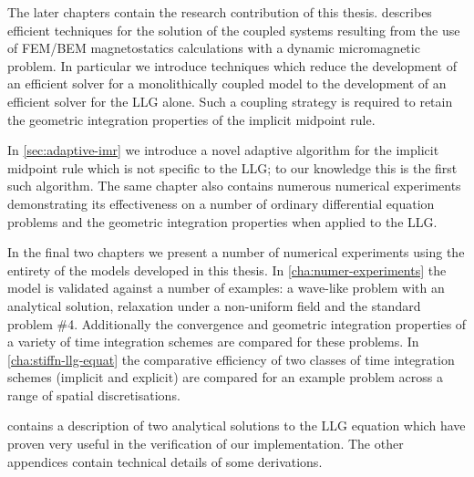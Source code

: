The later chapters contain the research contribution of this thesis.
 describes efficient techniques for the solution of the coupled systems resulting from the use of FEM/BEM magnetostatics calculations with a dynamic micromagnetic problem.
In particular we introduce techniques which reduce the development of an efficient solver for a monolithically coupled model to the development of an efficient solver for the LLG alone.
Such a coupling strategy is required to retain the geometric integration properties of the implicit midpoint rule.

In \cref{sec:adaptive-imr} we introduce a novel adaptive algorithm for the implicit midpoint rule which is not specific to the LLG; to our knowledge this is the first such algorithm.
The same chapter also contains numerous numerical experiments demonstrating its effectiveness on a number of ordinary differential equation problems and the geometric integration properties when applied to the LLG.

In the final two chapters we present a number of numerical experiments using the entirety of the models developed in this thesis.
In \cref{cha:numer-experiments} the model is validated against a number of examples: a wave-like problem with an analytical solution, relaxation under a non-uniform field and the \mumag standard problem \#4.
Additionally the convergence and geometric integration properties of a variety of time integration schemes are compared for these problems.
In \cref{cha:stiffn-llg-equat} the comparative efficiency of two classes of time integration schemes (implicit and explicit) are compared for an example problem across a range of spatial discretisations.

 contains a description of two analytical solutions to the LLG equation which have proven very useful in the verification of our implementation.
The other appendices contain technical details of some derivations.


